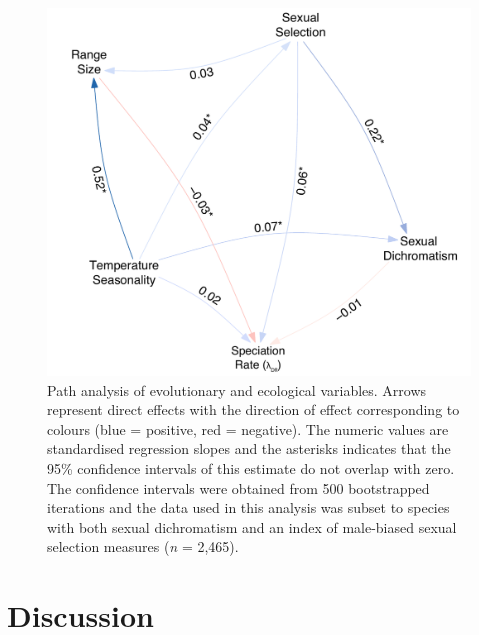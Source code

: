 \documentclass[]{article}
\begin{document}
\begin{figure}
\centering
\includegraphics{Figures/Path_Analysis.pdf}
\caption{Path analysis of evolutionary and ecological variables. Arrows
represent direct effects with the direction of effect corresponding to
colours (blue = positive, red = negative). The numeric values are
standardised regression slopes and the asterisks indicates that the 95\%
confidence intervals of this estimate do not overlap with zero. The
confidence intervals were obtained from 500 bootstrapped iterations and
the data used in this analysis was subset to species with both sexual
dichromatism and an index of male-biased sexual selection measures
(\emph{n} = 2,465). \label{Path_Analysis}}
\end{figure}

\newpage{}

\hypertarget{discussion}{%
\section{Discussion}\label{discussion}}
\end{document}
